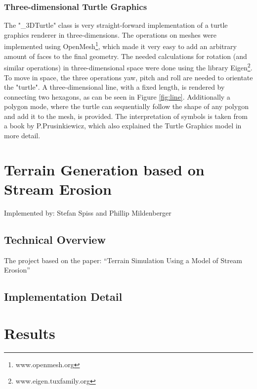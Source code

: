\documentclass[11pt,a4paper]{article}
\begin{document}
\subsubsection{Three-dimensional Turtle Graphics}
The "\_3DTurtle" class is very straight-forward implementation of a turtle graphics renderer in three-dimensions. The operations on meshes were implemented using OpenMesh\footnote{www.openmesh.org}, which made it very easy to add an arbitrary amount of faces to the final geometry. The needed calculations for rotation (and similar operations) in three-dimensional space were done using the library Eigen\footnote{www.eigen.tuxfamily.org}. To move in space, the three operations yaw, pitch and roll are needed to orientate the "turtle". A three-dimensional line, with a fixed length, is rendered by connecting two hexagons, as can be seen in Figure \ref{fig:line}. Additionally a polygon mode, where the turtle can sequentially follow the shape of any polygon and add it to the mesh, is provided. The interpretation of symbols is taken from a book by P.Prusinkiewicz, which also explained the Turtle Graphics model in more detail.

\section{Terrain Generation based on Stream Erosion}
Implemented by: Stefan Spiss and Phillip Mildenberger

\subsection{Technical Overview}
The project based on the paper: ``Terrain Simulation Using a Model of
Stream Erosion''\cite{kelley1988terrain}


\subsection{Implementation Detail}


\section{Results}


\newpage


\end{document}
